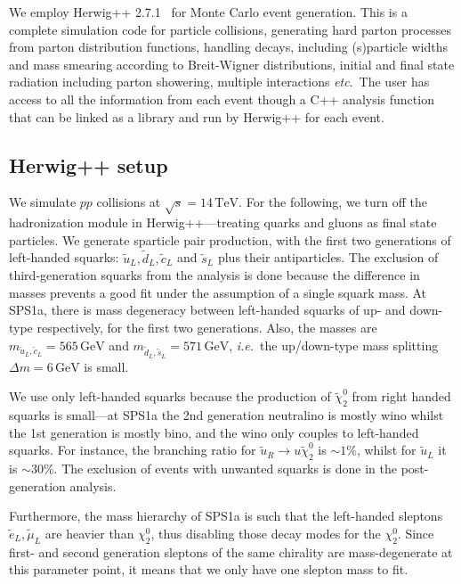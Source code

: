 \documentclass[twoside,english]{uiofysmaster}
\begin{document}
We employ {\ttfamily Herwig++  2.7.1}~\cite{Bahr:2008pv} for Monte Carlo event generation. This is a complete simulation code for particle collisions, generating hard parton processes from parton distribution functions, handling decays, including (s)particle widths and mass smearing according to Breit-Wigner distributions, initial and final state radiation including parton showering, multiple interactions {\it etc}.\ The user has access to all the information from each event though a {\ttfamily C++} analysis function that can be linked as a library and run by {\ttfamily Herwig++} for each event.

\subsection{{\ttfamily Herwig++} setup}

We simulate $pp$ collisions at $\sqrt{s}=14 \, \mathrm{TeV}$. For the following, we turn off the hadronization module in {\ttfamily Herwig++}---treating quarks and gluons as final state particles. 
We generate sparticle pair production, with the first two generations of left-handed squarks: $\tilde{u}_L,\tilde{d}_L,\tilde{c}_L$ and $\tilde{s}_L$ plus their antiparticles. The exclusion of third-generation squarks from the analysis is done because the difference in masses prevents a good fit under the assumption of a single squark mass. At SPS1a, there is mass degeneracy between left-handed squarks of up- and down-type respectively, for the first two generations. Also, the masses are $m_{\tilde u_L, \tilde c_L} = 565 \,\mathrm{GeV}$ and $m_{\tilde d_L, \tilde s_L} = 571 \, \mathrm{GeV}$, {\it i.e.}\ the up/down-type mass splitting $\Delta m = 6 \, \mathrm{GeV}$ is small. 

We use only left-handed squarks because the production of $\tilde \chi_2^0$ from right handed squarks is small---at SPS1a the 2nd generation neutralino is mostly wino whilst the 1st generation is mostly bino, and the wino only couples to left-handed squarks. For instance, the branching ratio for $\tilde u_R \to u \tilde \chi_2^0$ is $\sim 1 \%$, whilst for $\tilde u_L$ it is $\sim 30 \%$. The exclusion of events with unwanted squarks is done in the post-generation analysis.

Furthermore, the mass hierarchy of SPS1a is such that the left-handed sleptons $\tilde e_L, \tilde \mu_L$ are heavier than $\chi_2^0$, thus disabling those decay modes for the $\chi_2^0$. Since first- and second generation sleptons of the same chirality are mass-degenerate at this parameter point, it means that we only have one slepton mass to fit.
\end{document}
